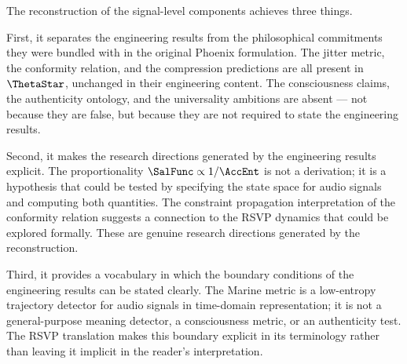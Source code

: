 The reconstruction of the signal-level components
achieves three things.

First, it separates the engineering results from the
philosophical commitments they were bundled with in
the original Phoenix formulation. The jitter metric,
the conformity relation, and the compression predictions
are all present in $\ThetaStar$, unchanged in their
engineering content. The consciousness claims, the
authenticity ontology, and the universality ambitions
are absent --- not because they are false, but because
they are not required to state the engineering results.

Second, it makes the research directions generated
by the engineering results explicit. The proportionality
$\SalFunc \propto 1/\AccEnt$ is not a derivation; it
is a hypothesis that could be tested by specifying
the state space for audio signals and computing both
quantities. The constraint propagation interpretation
of the conformity relation suggests a connection to
the RSVP dynamics that could be explored formally.
These are genuine research directions generated by
the reconstruction.

Third, it provides a vocabulary in which the boundary
conditions of the engineering results can be stated
clearly. The Marine metric is a low-entropy trajectory
detector for audio signals in time-domain representation;
it is not a general-purpose meaning detector, a
consciousness metric, or an authenticity test. The
RSVP translation makes this boundary explicit in its
terminology rather than leaving it implicit in the
reader's interpretation.
